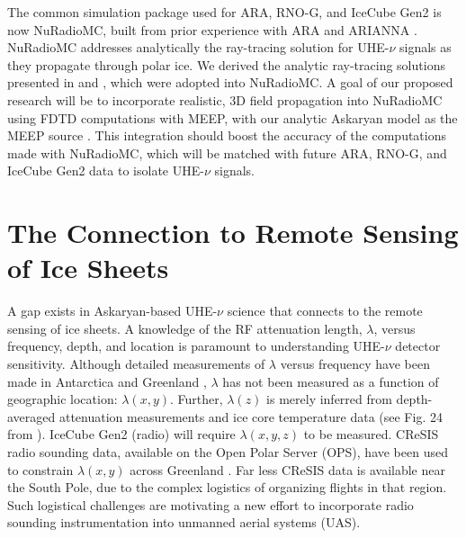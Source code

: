 \documentclass[10pt]{amsart}
\theoremstyle{definition}
\numberwithin{equation}{section}
\begin{document}
The common simulation package used for ARA, RNO-G, and IceCube Gen2 is now NuRadioMC, built from prior experience with ARA and ARIANNA \cite{10.1140/epjc/s10052-020-7612-8,10.1109/tns.2015.2468182,10.1016/j.astropartphys.2011.11.010,10.1016/j.astropartphys.2015.04.002,10.1103/physrevd.102.043021}.  NuRadioMC addresses analytically the ray-tracing solution for UHE-$\nu$ signals as they propagate through polar ice.  We derived the analytic ray-tracing solutions presented in \cite{10.1140/epjc/s10052-020-7612-8} and \cite{horizPaper}, which were adopted into NuRadioMC.  A goal of our proposed research will be to incorporate realistic, 3D field propagation into NuRadioMC using FDTD computations with MEEP, with our analytic Askaryan model as the MEEP source \cite{PhysRevD.105.123019,10.22323/1.395.1217}.  This integration should boost the accuracy of the computations made with NuRadioMC, which will be matched with future ARA, RNO-G, and IceCube Gen2 data to isolate UHE-$\nu$ signals.

\section{The Connection to Remote Sensing of Ice Sheets}
\label{sec:cresis}

A gap exists in Askaryan-based UHE-$\nu$ science that connects to the remote sensing of ice sheets.  A knowledge of the RF attenuation length, $\lambda$, versus frequency, depth, and location is paramount to understanding UHE-$\nu$ detector sensitivity.  Although detailed measurements of $\lambda$ versus frequency have been made in Antarctica and Greenland \cite{aguilar_2022,10.3189/2015jog14j214,10.3189/2015jog15j057,barwick_besson_gorham_saltzberg_2005}, $\lambda$ has not been measured as a function of geographic location: $\lambda(x,y)$.  Further, $\lambda(z)$ is merely inferred from depth-averaged attenuation measurements and ice core temperature data (see Fig. 24 from \cite{10.1016/j.astropartphys.2011.11.010}). IceCube Gen2 (radio) will require $\lambda(x,y,z)$ to be measured.  CReSIS radio sounding data, available on the Open Polar Server (OPS), have been used to constrain $\lambda(x,y)$ across Greenland \cite{10.1002/2015rs005849}.  Far less CReSIS data is available near the South Pole, due to the complex logistics of organizing flights in that region.  Such logistical challenges are motivating a new effort to incorporate radio sounding instrumentation into unmanned aerial systems (UAS). 
\end{document}

